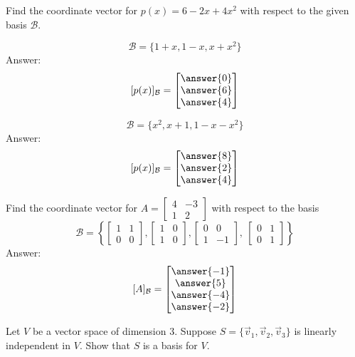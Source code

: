 \documentclass{ximera}
\begin{document}
\begin{problem}
Find the coordinate vector for $p(x)=6-2x+4x^2$ with respect to the given basis $\mathcal{B}$.

\begin{problem}
$$\mathcal{B}=\{1 + x, 1 - x, x + x^{2}\}$$
Answer:
$$[p(x)]_{\mathcal{B}}=\begin{bmatrix}\answer{0}\\\answer{6}\\\answer{4}\end{bmatrix}$$
\end{problem}

\begin{problem}
$$\mathcal{B}=\{x^{2}, x + 1, 1 - x - x^{2}\}$$
Answer:
$$[p(x)]_{\mathcal{B}}=\begin{bmatrix}\answer{8}\\\answer{2}\\\answer{4}\end{bmatrix}$$
\end{problem}
\end{problem}
\begin{problem}
Find the coordinate vector for $A=\begin{bmatrix}4&-3\\1&2\end{bmatrix}$ with respect to the basis
$$\mathcal{B}=
\left\{
\begin{bmatrix}
1 & 1 \\
0 & 0
\end{bmatrix}
, 
\begin{bmatrix}
1 & 0 \\
1 & 0
\end{bmatrix}
, 
\begin{bmatrix}
0 & 0 \\
1 & -1
\end{bmatrix}
,\
\begin{bmatrix}
0 & 1 \\
0 & 1
\end{bmatrix}
\right\}$$ 
Answer:
$$[A]_{\mathcal{B}}=\begin{bmatrix}\answer{-1}\\\answer{5}\\\answer{-4}\\\answer{-2}\end{bmatrix}$$
\end{problem}

\begin{problem}
Let $V$ be a vector space of dimension $3$.  Suppose $S=\{\vec{v}_1, \vec{v}_2, \vec{v}_3\}$ is linearly independent in $V$.  Show that $S$ is a basis for $V$.
\end{problem}
\end{document}
